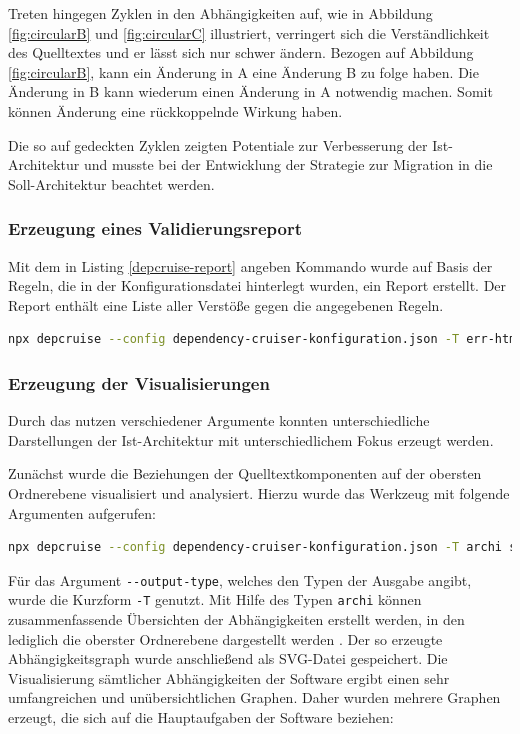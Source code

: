 Treten hingegen Zyklen in den Abhängigkeiten auf, wie in Abbildung \ref{fig:circularB} und \ref{fig:circularC} illustriert, verringert sich die Verständlichkeit des Quelltextes und er lässt sich nur schwer ändern. Bezogen auf Abbildung \ref{fig:circularB}, kann ein Änderung in A eine Änderung B zu folge haben. Die Änderung in B kann wiederum einen Änderung in A notwendig machen. Somit können Änderung eine rückkoppelnde Wirkung haben.

Die so auf gedeckten Zyklen zeigten Potentiale zur Verbesserung der Ist-Architektur und musste bei der Entwicklung der Strategie zur Migration in die Soll-Architektur beachtet werden.

\subsubsection{Erzeugung eines Validierungsreport}
Mit dem in Listing \ref{depcruise-report} angeben Kommando wurde auf Basis der Regeln, die in der Konfigurationsdatei hinterlegt wurden, ein Report erstellt.
Der Report enthält eine Liste aller Verstöße gegen die angegebenen Regeln.
\begin{lstlisting}[language={sh}, label=depcruise-report, caption=Erzeugung eines Validierungsreport]
npx depcruise --config dependency-cruiser-konfiguration.json -T err-html src -f Validierungsreport.html
\end{lstlisting}

\subsubsection{Erzeugung der Visualisierungen}
Durch das nutzen verschiedener Argumente konnten unterschiedliche Darstellungen der Ist-Architektur mit unterschiedlichem Fokus erzeugt werden. 

Zunächst wurde die Beziehungen der Quelltextkomponenten auf der obersten Ordnerebene visualisiert und analysiert. 
Hierzu wurde das Werkzeug mit folgende Argumenten aufgerufen:

\begin{lstlisting}[language={sh}, label=depcruise-overview, caption=Kommando zur Erzeugung der Visualisierung der obersten Ordnerebene]
npx depcruise --config dependency-cruiser-konfiguration.json -T archi src | dot -T svg > Projektuebersicht.svg
\end{lstlisting}

Für das Argument \lstinline|--output-type|, welches den Typen der Ausgabe angibt, wurde die Kurzform  \lstinline|-T| genutzt. Mit Hilfe des Typen \lstinline|archi| können zusammenfassende Übersichten der Abhängigkeiten erstellt werden, in den lediglich die oberster Ordnerebene dargestellt werden \autocite[vgl.][]{Verweij:Options}.
Der so erzeugte Abhängigkeitsgraph wurde anschließend als SVG-Datei gespeichert. 
\newline
Die Visualisierung sämtlicher Abhängigkeiten der Software ergibt einen sehr umfangreichen und unübersichtlichen Graphen. Daher wurden mehrere Graphen erzeugt, die sich auf die Hauptaufgaben der Software beziehen:

